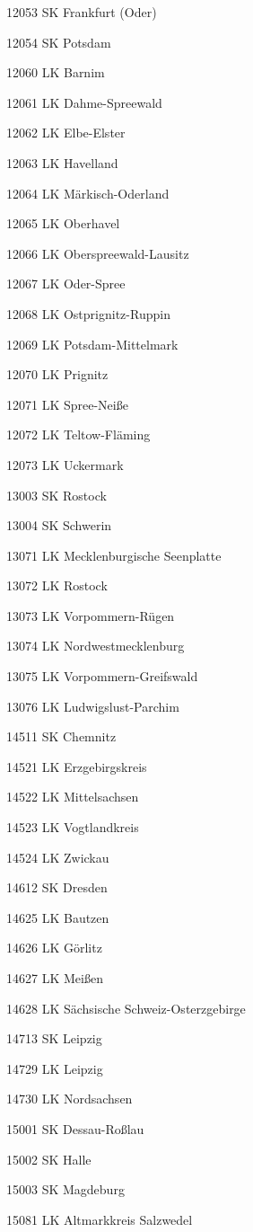 12053  SK Frankfurt (Oder)

12054  SK Potsdam

12060  LK Barnim

12061  LK Dahme-Spreewald

12062  LK Elbe-Elster

12063  LK Havelland

12064  LK Märkisch-Oderland

12065  LK Oberhavel

12066  LK Oberspreewald-Lausitz

12067  LK Oder-Spree

12068  LK Ostprignitz-Ruppin

12069  LK Potsdam-Mittelmark

12070  LK Prignitz

12071  LK Spree-Neiße

12072  LK Teltow-Fläming

12073  LK Uckermark

13003  SK Rostock

13004  SK Schwerin

13071  LK Mecklenburgische Seenplatte

13072  LK Rostock

13073  LK Vorpommern-Rügen

13074  LK Nordwestmecklenburg

13075  LK Vorpommern-Greifswald

13076  LK Ludwigslust-Parchim

14511  SK Chemnitz

14521  LK Erzgebirgskreis

14522  LK Mittelsachsen

14523  LK Vogtlandkreis

14524  LK Zwickau

14612  SK Dresden

14625  LK Bautzen

14626  LK Görlitz

14627  LK Meißen

14628  LK Sächsische Schweiz-Osterzgebirge

14713  SK Leipzig

14729  LK Leipzig

14730  LK Nordsachsen

15001  SK Dessau-Roßlau

15002  SK Halle

15003  SK Magdeburg

15081  LK Altmarkkreis Salzwedel

